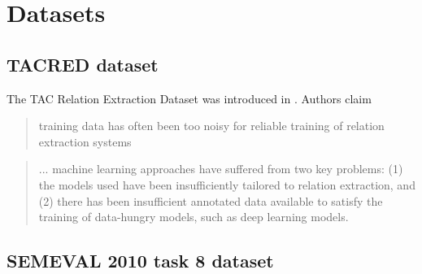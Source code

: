 \chapter{Datasets}


\section{TACRED dataset}
The TAC Relation Extraction Dataset was introduced in \cite{zhang2017tacred}. Authors claim \begin{quote}
 training data has often been
too noisy for reliable training of relation extraction systems
\end{quote}

\begin{quotation}
... machine learning approaches have suffered from two key problems: (1) the models used have been insufficiently tailored to relation extraction, and (2) there has been insufficient annotated data available to satisfy the training of data-hungry models, such as deep learning models.
\end{quotation} 

\section{SEMEVAL 2010 task 8 dataset}
